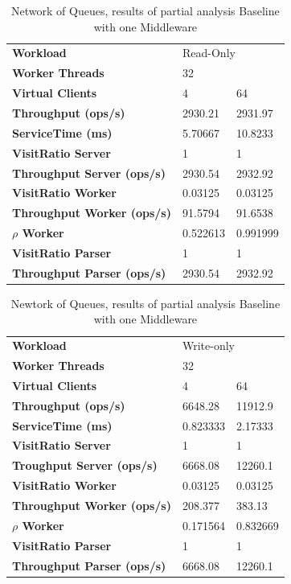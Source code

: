 \documentclass[11pt,a4paper]{article}
\begin{document}
\begin{table}[!htb]
\centering
    \caption{Network of Queues, results of partial analysis Baseline with one Middleware}
\begin{tabular}{lll}
\toprule
    \textbf{Workload}& \multicolumn{2}{l}{Read-Only} \\
    \textbf{Worker Threads} & \multicolumn{2}{l}{32} \\
    \textbf{Virtual Clients} &        4  &        64 \\
\midrule
    \textbf{Throughput (ops/s)} &   2930.21 &   2931.97 \\
    \textbf{ServiceTime (ms)}   &   5.70667 &   10.8233 \\
    \textbf{VisitRatio Server}           &         1 &         1 \\
    \textbf{Throughput Server (ops/s)}          &   2930.54 &   2932.92 \\
    \textbf{VisitRatio Worker}           &   0.03125 &   0.03125 \\
    \textbf{Throughput Worker (ops/s)}          &   91.5794 &   91.6538 \\
    \textbf{$\rho$ Worker}        &  0.522613 &  0.991999 \\
    \textbf{VisitRatio Parser}           &         1 &         1 \\
    \textbf{Throughput Parser (ops/s)}          &   2930.54 &   2932.92 \\
\bottomrule
\end{tabular}
\end{table}

\begin{table}[!htb]
\centering
    \caption{Newtork of Queues, results of partial analysis Baseline with one Middleware}
\begin{tabular}{lll}
\toprule
\textbf{Workload} & \multicolumn{2}{l}{Write-only} \\
\textbf{Worker Threads} & \multicolumn{2}{l}{32} \\
\textbf{Virtual Clients} &        4  &        64 \\
\midrule
    \textbf{Throughput (ops/s)} &   6648.28 &   11912.9 \\
    \textbf{ServiceTime (ms)}   &  0.823333 &   2.17333 \\
    \textbf{VisitRatio Server}           &         1 &         1 \\
    \textbf{Troughput Server (ops/s)}          &   6668.08 &   12260.1 \\
    \textbf{VisitRatio Worker}           &   0.03125 &   0.03125 \\
    \textbf{Throughput Worker (ops/s)}          &   208.377 &    383.13 \\
    \textbf{$\rho$ Worker}         &  0.171564 &  0.832669 \\
    \textbf{VisitRatio Parser}           &         1 &         1 \\
    \textbf{Throughput Parser (ops/s)}          &   6668.08 &   12260.1 \\
\bottomrule
\end{tabular}
\end{table}
\end{document}
